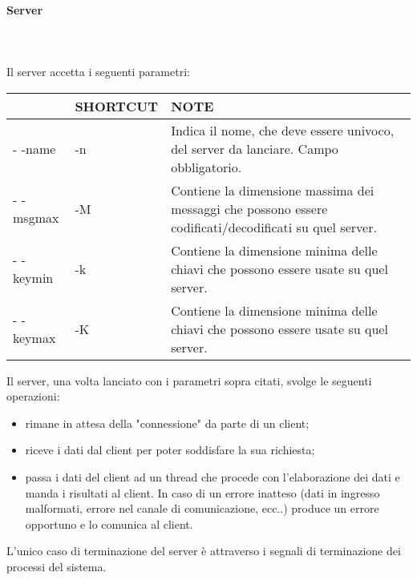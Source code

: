 \documentclass[12pt]{article}
\begin{document}
\paragraph{Server} \mbox{}\\ \\
Il server accetta i seguenti parametri:

\begin{center}
    \begin{tabular}{| >{\centering\arraybackslash}m{2.5cm} | >{\centering\arraybackslash}m{2.5cm} | m{9cm}|}
    \hline
    {\bf OPZIONE} & {\bf SHORTCUT} & {\bf NOTE}\\ \hline
    - -name & -n & Indica il nome, che deve essere univoco, del server da lanciare. Campo obbligatorio. \\ \hline
   	- -msgmax & -M & Contiene la dimensione massima dei messaggi che possono essere codificati/decodificati su quel server.\\ \hline
   	- -keymin & -k & Contiene la dimensione minima delle chiavi che possono essere usate su quel server.\\ \hline
   	- -keymax & -K & Contiene la dimensione minima delle chiavi che possono essere usate su quel server.\\
    \hline

  \end{tabular}  
  \end{center}

\noindent Il server, una volta lanciato con i parametri sopra citati, svolge le seguenti operazioni:
\begin{itemize}
    \item rimane in attesa della "connessione" da parte di un client;
    \item riceve i dati dal client per poter soddisfare la sua richiesta;
    \item passa i dati del client ad un thread che procede con l'elaborazione dei dati e manda i risultati al client. In caso di un errore inatteso (dati in ingresso malformati, errore nel canale di comunicazione, ecc..) produce un errore opportuno e lo comunica al client.
\end{itemize}
L'unico caso di terminazione del server è attraverso i segnali di terminazione dei processi del sistema.
\end{document}
